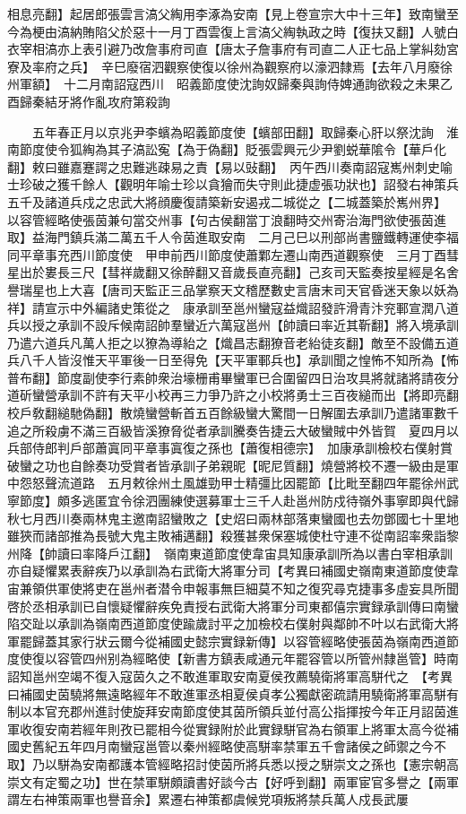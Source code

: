 相息亮翻】起居郎張雲言滈父綯用李涿為安南【見上卷宣宗大中十三年】致南蠻至今為梗由滈納賄陷父於惡十一月丁酉雲復上言滈父綯執政之時【復扶又翻】人號白衣宰相滈亦上表引避乃改詹事府司直【唐太子詹事府有司直二人正七品上掌糾劾宮寮及率府之兵】　辛巳廢宿泗觀察使復以徐州為觀察府以濠泗隸焉【去年八月廢徐州軍額】　十二月南詔寇西川　昭義節度使沈詢奴歸秦與詢侍婢通詢欲殺之未果乙酉歸秦結牙將作亂攻府第殺詢

　　五年春正月以京兆尹李蠙為昭義節度使【蠙部田翻】取歸秦心肝以祭沈詢　淮南節度使令狐綯為其子滈訟寃【為于偽翻】貶張雲興元少尹劉蜕華隂令【華戶化翻】敕曰雖嘉蹇諤之忠難逃疎易之責【易以䜴翻】　丙午西川奏南詔寇嶲州刺史喻士珍破之獲千餘人【觀明年喻士珍以貪獪而失守則此捷虚張功狀也】詔發右神策兵五千及諸道兵戍之忠武大將顔慶復請築新安遏戎二城從之【二城蓋築於嶲州界】　以容管經略使張茵兼句當交州事【句古侯翻當丁浪翻時交州寄治海門欲使張茵進取】益海門鎮兵滿二萬五千人令茵進取安南　二月己巳以刑部尚書鹽鐵轉運使李福同平章事充西川節度使　甲申前西川節度使蕭鄴左遷山南西道觀察使　三月丁酉彗星出於婁長三尺【彗祥歲翻又徐醉翻又音歲長直亮翻】己亥司天監奏按星經是名舍譽瑞星也上大喜【唐司天監正三品掌察天文稽歷數史言唐末司天官昏迷天象以妖為祥】請宣示中外編諸史策從之　康承訓至邕州蠻寇益熾詔發許滑青汴兖鄆宣潤八道兵以授之承訓不設斥候南詔帥羣蠻近六萬寇邕州【帥讀曰率近其靳翻】將入境承訓乃遣六道兵凡萬人拒之以獠為導紿之【熾昌志翻獠音老紿徒亥翻】敵至不設備五道兵八千人皆沒惟天平軍後一日至得免【天平軍鄆兵也】承訓聞之惶怖不知所為【怖普布翻】節度副使李行素帥衆治壕栅甫畢蠻軍已合圍留四日治攻具將就諸將請夜分道斫蠻營承訓不許有天平小校再三力爭乃許之小校將勇士三百夜縋而出【將即亮翻校戶敎翻縋馳偽翻】散燒蠻營斬首五百餘級蠻大驚間一日解圍去承訓乃遣諸軍數千追之所殺虜不滿三百級皆溪獠脅從者承訓騰奏告捷云大破蠻賊中外皆賀　夏四月以兵部侍郎判戶部蕭寘同平章事寘復之孫也【蕭復相德宗】　加康承訓檢校右僕射賞破蠻之功也自餘奏功受賞者皆承訓子弟親昵【昵尼質翻】燒營將校不遷一級由是軍中怨怒聲流道路　五月敕徐州土風雄勁甲士精彊比因罷節【比毗至翻四年罷徐州武寧節度】頗多逃匿宜令徐泗團練使選募軍士三千人赴邕州防戍待嶺外事寧即與代歸秋七月西川奏兩林鬼主邀南詔蠻敗之【史炤曰兩林部落東蠻國也去勿鄧國七十里地雖狹而諸部推為長號大鬼主敗補邁翻】殺獲甚衆保塞城使杜守連不從南詔率衆詣黎州降【帥讀曰率降戶江翻】　嶺南東道節度使韋宙具知康承訓所為以書白宰相承訓亦自疑懼累表辭疾乃以承訓為右武衛大將軍分司【考異曰補國史嶺南東道節度使韋宙兼領供軍使將吏在邕州者潜令申報事無巨細莫不知之復究尋克捷事多虛妄具所聞啓於丞相承訓已自懷疑懼辭疾免責授右武衛大將軍分司東都僖宗實録承訓傳曰南蠻陷交趾以承訓為嶺南西道節度使踰歲討平之加檢校右僕射與鄰帥不叶以右武衛大將軍罷歸蓋其家行狀云爾今從補國史懿宗實録新傳】以容管經略使張茵為嶺南西道節度使復以容管四州别為經略使【新書方鎮表咸通元年罷容管以所管州隸邕管】時南詔知邕州空竭不復入寇茵久之不敢進軍取安南夏侯孜薦驍衛將軍高駢代之　【考異曰補國史茵驍將無遠略經年不敢進軍丞相夏侯貞孝公獨獻密疏請用驍衛將軍高駢有制以本官充郡州進討使旋拜安南節度使其茵所領兵並付高公指揮按今年正月詔茵進軍收復安南若經年則孜已罷相今從實録附於此實録駢官為右領軍上將軍太高今從補國史舊紀五年四月南蠻寇邕管以秦州經略使高駢率禁軍五千會諸侯之師禦之今不取】乃以駢為安南都護本管經略招討使茵所將兵悉以授之駢崇文之孫也【憲宗朝高崇文有定蜀之功】世在禁軍駢頗讀書好談今古【好呼到翻】兩軍宦官多譽之【兩軍謂左右神策兩軍也譽音余】累遷右神策都虞候党項叛將禁兵萬人戍長武屢